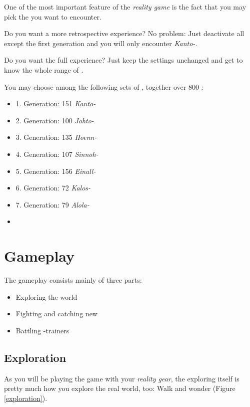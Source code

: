 One of the most important feature of the \emph{\poke{} reality game} is the fact that you may pick the \poke{} you want to encounter. 

Do you want a more retrospective experience? No problem: Just deactivate all \poke{} except the first generation and you will only encounter \emph{Kanto-\poke{}}.

Do you want the full experience? Just keep the settings unchanged and get to know the whole range of \poke{}.

You may choose among the following sets of \poke{}, together over 800 \poke{}:
\begin{multicols}{2}
\begin{itemize}
\setlength\itemsep{.05em}
\item 1. Generation: 151 \emph{Kanto-\pokeT}
\item 2. Generation: 100 \emph{Johto-\pokeT}
\item 3. Generation: 135 \emph{Hoenn-\pokeT}
\item 4. Generation: 107 \emph{Sinnoh-\pokeT}
\item 5. Generation: 156 \emph{Einall-\pokeT}
\item 6. Generation: 72 \emph{Kalos-\pokeT}
\item 7. Generation: 79 \emph{Alola-\pokeT}
\item[]
\end{itemize}
\end{multicols}

\section{Gameplay}

The gameplay consists mainly of three parts:
\begin{itemize}
\item Exploring the world
\item Fighting and catching new \poke{}
\item Battling \poke{}-trainers
\end{itemize}

\subsection{Exploration}

As you will be playing the game with your \emph{\poke{} reality gear}, the exploring itself is pretty much how you explore the real world, too: Walk and wonder (Figure \ref{exploration}).

